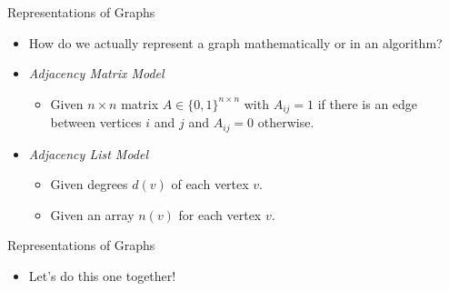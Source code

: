 \documentclass[aspectratio=169, handout]{beamer}
\begin{document}
\begin{frame}{Representations of Graphs}
    \begin{itemize}
        \item How do we actually represent a graph mathematically or in an algorithm? \pause
        \item \emph{Adjacency Matrix Model}
        \begin{itemize}
            \item Given $n \times n$ matrix $A \in \{0, 1\}^{n \times n}$ with $A_{ij} = 1$ if there is an edge between vertices $i$ and $j$ and $A_{ij} = 0$ otherwise. 
        \end{itemize} \pause
        \item \emph{Adjacency List Model}
        \begin{itemize}
            \item Given degrees $d(v)$ of each vertex $v$.
            \item Given an array $n(v)$ for each vertex $v$.
        \end{itemize}
    \end{itemize}
\end{frame}

\begin{frame}{Representations of Graphs}
     \begin{itemize}
        \item Let's do this one together!
    \end{itemize}
    \begin{center}
    \end{center} 
    \pause
\end{frame}
\end{document}
